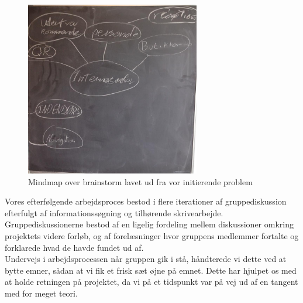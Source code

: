 \documentclass[article,oneside,12pt]{memoir}
\begin{document}
\clearpage
\begin{figure}[ht!]
    \centering
    \includegraphics[width=3in]{billede3.jpg}
    \caption{Mindmap over brainstorm lavet ud fra vor initierende problem}
\end{figure}
Vores efterfølgende arbejdsproces bestod i flere iterationer af gruppediskussion efterfulgt af informationssøgning og tilhørende skrivearbejde. Gruppediskussionerne bestod af en ligelig fordeling mellem diskussioner omkring projektets videre forløb, og af forelæsninger hvor gruppens medlemmer fortalte og forklarede hvad de havde fundet ud af.\\
Undervejs i arbejdsprocessen når gruppen gik i stå, håndterede vi dette ved at bytte emner, sådan at vi fik et frisk sæt øjne på emnet. Dette har hjulpet os med at holde retningen på projektet, da vi på et tidspunkt var på vej ud af en tangent med for meget teori.
\end{document}
